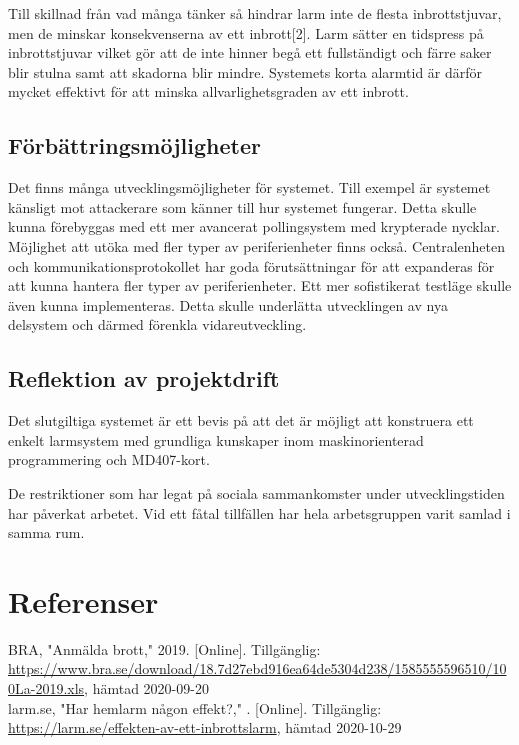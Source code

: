 \documentclass[a4paper]{article}
\newcommand{\todo}[1]{\marginpar{TODO: #1}\vspace{1cm}}
\newcommand{\citewebpage}[6]{\noindent [#1] #2, "#3," #4. [Online]. Tillgänglig: \url{#5},  hämtad #6\\}
\begin{document}
Till skillnad från vad många tänker så hindrar larm inte de flesta inbrottstjuvar, men de minskar konsekvenserna av ett inbrott[2]. Larm sätter en tidspress på inbrottstjuvar vilket gör att de inte hinner begå ett fullständigt och färre saker blir stulna samt att skadorna blir mindre. Systemets korta alarmtid är därför mycket effektivt för att minska allvarlighetsgraden av ett inbrott.

\subsection{Förbättringsmöjligheter}
Det finns många utvecklingsmöjligheter för systemet.
Till exempel är systemet känsligt mot attackerare som känner till hur systemet fungerar.
Detta skulle kunna förebyggas med ett mer avancerat pollingsystem med krypterade nycklar.
Möjlighet att utöka med fler typer av periferienheter finns också.
Centralenheten och kommunikationsprotokollet har goda förutsättningar för att expanderas för att kunna hantera fler typer av periferienheter.
Ett mer sofistikerat testläge skulle även kunna implementeras.
Detta skulle underlätta utvecklingen av nya delsystem och därmed förenkla vidareutveckling.

\subsection{Reflektion av projektdrift}
Det slutgiltiga systemet är ett bevis på att det är möjligt att konstruera ett enkelt larmsystem med grundliga kunskaper inom maskinorienterad programmering och MD407-kort.

De restriktioner som har legat på sociala sammankomster under utvecklingstiden har påverkat arbetet. Vid ett fåtal tillfällen har hela arbetsgruppen varit samlad i samma rum.


\section{Referenser}
\citewebpage{1}{BRA}{Anmälda brott}{2019}{https://www.bra.se/download/18.7d27ebd916ea64de5304d238/1585555596510/100La-2019.xls}{2020-09-20}

\citewebpage{2}{larm.se}{Har hemlarm någon effekt?}{}{https://larm.se/effekten-av-ett-inbrottslarm}{2020-10-29}
\end{document}
